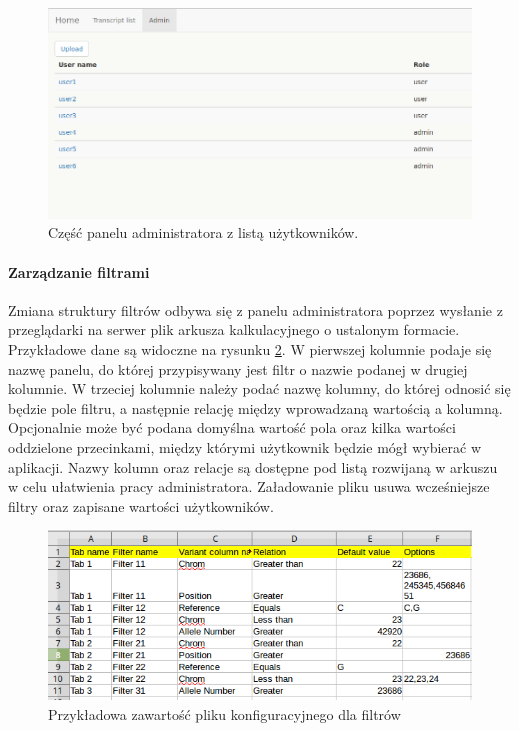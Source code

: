 \documentclass[a4paper,12pt,twoside]{article}
\begin{document}
\begin{figure}[h]
\centering
\includegraphics[width=\textwidth]{obrazy/aplikacja/admin.png}
\caption{Część panelu administratora z listą użytkowników.}
\label{fig:adminpic}
\end{figure}

\newpage
\paragraph{Zarządzanie filtrami}

Zmiana struktury filtrów odbywa się z panelu administratora poprzez wysłanie
z przeglądarki na serwer plik arkusza kalkulacyjnego o ustalonym formacie. Przykładowe dane są widoczne na rysunku \ref{fig:input_filepic}.
W pierwszej kolumnie podaje się nazwę panelu, do której przypisywany
jest filtr o nazwie podanej w drugiej kolumnie. W trzeciej kolumnie należy podać nazwę kolumny, do której
odnosić się będzie pole filtru, a następnie relację między wprowadzaną wartością a kolumną.
Opcjonalnie może być podana domyślna wartość pola oraz kilka wartości oddzielone przecinkami, między którymi użytkownik będzie mógł wybierać w aplikacji. Nazwy kolumn oraz relacje są dostępne pod
listą rozwijaną w arkuszu w celu ułatwienia pracy administratora.
Załadowanie pliku usuwa wcześniejsze filtry oraz zapisane wartości użytkowników.

\begin{figure}[h!]
\centering
\includegraphics[width=\textwidth]{obrazy/aplikacja/input_file.png}
\caption{Przykładowa zawartość pliku konfiguracyjnego dla filtrów}
\label{fig:input_filepic}
\end{figure}
\end{document}
